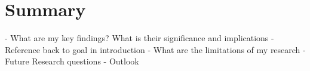 \chapter{Summary}
- What are my key findings? What is their significance and implications
- Reference back to goal in introduction
- What are the limitations of my research
- Future Research questions
- Outlook
